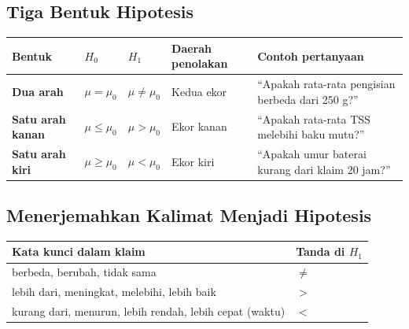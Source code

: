 \documentclass[
  indonesian,
  letterpaper,
]{book}
\newcounter{none} %
\begin{document}
\subsection{Tiga Bentuk Hipotesis}\label{tiga-bentuk-hipotesis}

{\def\LTcaptype{none} %
\begin{longtable}[]{@{}
  >{\raggedright\arraybackslash}p{}
  >{\raggedright\arraybackslash}p{}
  >{\raggedright\arraybackslash}p{}
  >{\raggedright\arraybackslash}p{}
  >{\raggedright\arraybackslash}p{}@{}}
\toprule\noalign{}
\begin{minipage}[b]{\linewidth}\raggedright
Bentuk
\end{minipage} & \begin{minipage}[b]{\linewidth}\raggedright
\(H_0\)
\end{minipage} & \begin{minipage}[b]{\linewidth}\raggedright
\(H_1\)
\end{minipage} & \begin{minipage}[b]{\linewidth}\raggedright
Daerah penolakan
\end{minipage} & \begin{minipage}[b]{\linewidth}\raggedright
Contoh pertanyaan
\end{minipage} \\
\midrule\noalign{}
\endhead
\bottomrule\noalign{}
\endlastfoot
\textbf{Dua arah} & \(\mu = \mu_0\) & \(\mu \ne \mu_0\) & Kedua ekor &
``Apakah rata-rata pengisian berbeda dari 250 g?'' \\
\textbf{Satu arah kanan} & \(\mu \le \mu_0\) & \(\mu > \mu_0\) & Ekor
kanan & ``Apakah rata-rata TSS melebihi baku mutu?'' \\
\textbf{Satu arah kiri} & \(\mu \ge \mu_0\) & \(\mu < \mu_0\) & Ekor
kiri & ``Apakah umur baterai kurang dari klaim 20 jam?'' \\
\end{longtable}
}

\subsection{Menerjemahkan Kalimat Menjadi
Hipotesis}\label{menerjemahkan-kalimat-menjadi-hipotesis}

{\def\LTcaptype{none} %
\begin{longtable}[]{@{}ll@{}}
\toprule\noalign{}
Kata kunci dalam klaim & Tanda di \(H_1\) \\
\midrule\noalign{}
\endhead
\bottomrule\noalign{}
\endlastfoot
berbeda, berubah, tidak sama & \(\ne\) \\
lebih dari, meningkat, melebihi, lebih baik & \(>\) \\
kurang dari, menurun, lebih rendah, lebih cepat (waktu) & \(<\) \\
\end{longtable}
}
\end{document}
